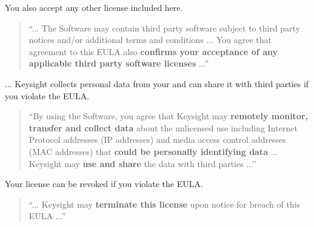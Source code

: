 \documentclass[12pt,a4paper]{article}
\begin{document}
You also accept any other license included here.
\begin{quote}
  ``... The Software may contain third party software subject to third party notices and/or additional terms and conditions ... You agree that agreement to this EULA also \textbf{confirms your acceptance of any applicable third party software licenses} ...''
\end{quote}
... Keysight collects personal data from your and can share it with third parties if you violate the EULA.
\begin{quote}
  ``By using the Software, you agree that Keysight may \textbf{remotely monitor, transfer and collect data} about the unlicensed use including Internet Protocol addresses (IP addresses) and media access control addresses (MAC addresses) that \textbf{could be personally identifying data} ... Keysight may \textbf{use and share} the data with third parties ...''
\end{quote}
Your license can be revoked if you violate the EULA.
\begin{quote}
  ``... Keysight may \textbf{terminate this license} upon notice for breach of this EULA ...''
\end{quote}
\end{document}
